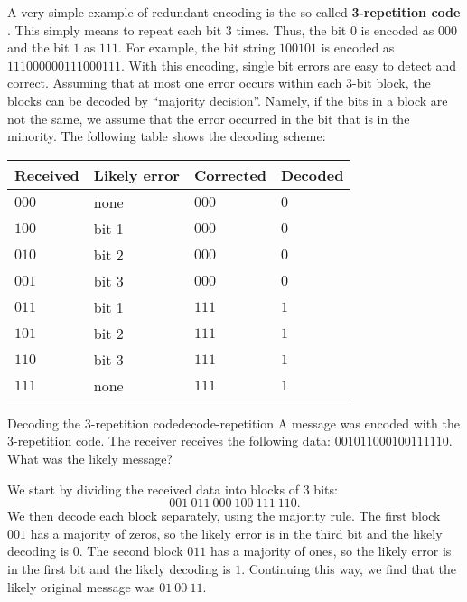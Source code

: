 A very simple example of redundant encoding is the so-called
\textbf{3-repetition code}%
%
. This simply means to repeat each bit 3
times. Thus, the bit $0$ is encoded as $000$ and the bit $1$ as
$111$. For example, the bit string $100101$ is encoded as
$111000000111000111$. With this encoding, single bit errors are easy
to detect and correct. Assuming that at most one error occurs within
each 3-bit block, the blocks can be decoded by ``majority
decision''. Namely, if the bits in a block are not the same, we assume
that the error occurred in the bit that is in the minority. The
following table shows the decoding scheme:
\begin{center}
  \begin{tabular}{|l|l|l|l|}
    \hline
    Received & Likely error & Corrected & Decoded \\\hline
    $000$    & none         & $000$     & $0$     \\
    $100$    & bit 1        & $000$     & $0$     \\
    $010$    & bit 2        & $000$     & $0$     \\
    $001$    & bit 3        & $000$     & $0$     \\
    $011$    & bit 1        & $111$     & $1$     \\
    $101$    & bit 2        & $111$     & $1$     \\
    $110$    & bit 3        & $111$     & $1$     \\
    $111$    & none         & $111$     & $1$     \\\hline
  \end{tabular}
\end{center}

\begin{example}{Decoding the 3-repetition code}{decode-repetition}
  A message was encoded with the 3-repetition code. The receiver
  receives the following data: $001011000100111110$. What was the
  likely message?
\end{example}

\begin{solution}
  We start by dividing the received data into blocks of 3 bits:
  \begin{equation*}
    001~011~000~100~111~110.
  \end{equation*}
  We then decode each block separately, using the majority rule.
  The first block $001$ has a majority of zeros, so the likely error is
  in the third bit and the likely decoding is $0$. The second block $011$
  has a majority of ones, so the likely error is in the first bit and
  the likely decoding is $1$. Continuing this way, we find that the
  likely original message was $01~00~11$.
\end{solution}

